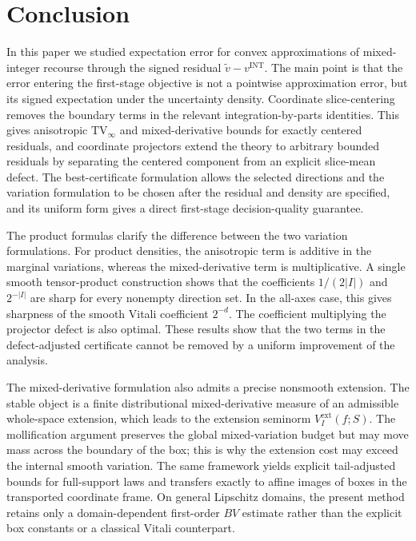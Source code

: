 \documentclass[11pt,letterpaper]{article}
\theoremstyle{definition}
\theoremstyle{remark}
\newcommand{\INT}{\mathrm{INT}}
\newcommand{\TV}{\mathrm{TV}}
\begin{document}
\section{Conclusion}
\label{sec:conclusion}
 

In this paper we studied expectation error for convex approximations of
mixed-integer recourse through the signed residual
$\widetilde v-v^{\INT}$. The main point is that the error entering the
first-stage objective is not a pointwise approximation error, but its signed
expectation under the uncertainty density. Coordinate slice-centering removes
the boundary terms in the relevant integration-by-parts identities. This gives
anisotropic $\TV_\infty$ and mixed-derivative bounds for exactly centered
residuals, and coordinate projectors extend the theory to arbitrary bounded residuals
by separating the centered component from an explicit slice-mean defect. The
best-certificate formulation allows the selected directions and the variation
formulation to be chosen after the residual and density are specified, and its
uniform form gives a direct first-stage decision-quality guarantee.

The product formulas clarify the difference between the two variation
formulations. For product densities, the anisotropic term is additive in the
marginal variations, whereas the mixed-derivative term is multiplicative. A
single smooth tensor-product construction shows that the coefficients
$1/(2|I|)$ and $2^{-|I|}$ are sharp for every nonempty direction set. In the
all-axes case, this gives sharpness of the smooth Vitali coefficient $2^{-d}$.
The coefficient multiplying the projector defect is also optimal. These
results show that the two terms in the defect-adjusted certificate cannot be
removed by a uniform improvement of the analysis.

The mixed-derivative formulation also admits a precise nonsmooth extension. The
stable object is a finite distributional mixed-derivative measure of an
admissible whole-space extension, which leads to the extension seminorm
$V_I^{\mathrm{ext}}(f;S)$. The mollification argument preserves the global
mixed-variation budget but may move mass across the boundary of the box; this
is why the extension cost may exceed the internal smooth variation. The same
framework yields explicit tail-adjusted bounds for full-support laws and
transfers exactly to affine images of boxes in the transported coordinate
frame. On general Lipschitz domains, the present method retains only a
domain-dependent first-order $BV$ estimate rather than the explicit box
constants or a classical Vitali counterpart.
\end{document}
